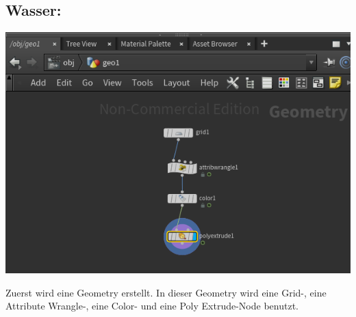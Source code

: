 \documentclass[paper=a4,fontsize=12pt,ngerman]{scrartcl}
\begin{document}
	\subsection*{Wasser:}
	\begin{minipage}{0.5\textwidth}
		\includegraphics[width=\textwidth]{graphics/wasser_1.png}
	\end{minipage}
	\begin{minipage}{0.5\textwidth}
		Zuerst wird eine Geometry erstellt. In dieser Geometry wird eine Grid-, eine Attribute Wrangle-, eine Color- und eine Poly Extrude-Node benutzt.
	\end{minipage}
	
\end{document}
